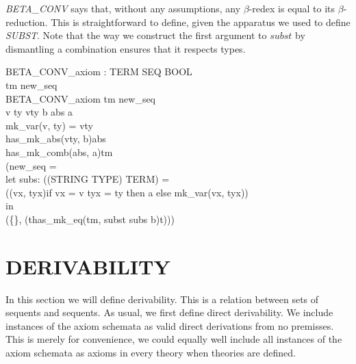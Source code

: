 \documentclass[a4paper,11pt,titlepage]{article}
\begin{document}
\begin{titlepage}
{\it BETA\_CONV} says that, without any assumptions,
any $\beta$-redex is
equal to its $\beta$-reduction.
This is straightforward
to define, given the apparatus we used to define
{\it SUBST}.
Note that the way we construct the first argument to
$subst$ by dismantling a combination ensures that it
respects types.
\begin{HOLConst}
\+	\PrNL{}BETA\_CONV\_axiom\PrNN{} : TERM \MMM{\rightarrow} SEQ \MMM{\rightarrow} BOOL\\
\PrPH{}
\+	\MMM{\forall} tm new\_seq\MMM{\bullet}\\
\+	BETA\_CONV\_axiom tm new\_seq \MMM{\Leftrightarrow}\\
\+	\MMM{\exists} v ty vty b abs a \MMM{\bullet}\\
\+	mk\_var(v, ty) = vty \MMM{\land}\\
\+	has\_mk\_abs(vty, b)abs \MMM{\land}\\
\+	has\_mk\_comb(abs, a)tm \MMM{\land}\\
\+	(new\_seq =\\
\+	let subs: ((STRING \MMM{\times} TYPE) \MMM{\rightarrow} TERM) =\\
\+		(\MMM{\lambda}(vx, tyx)\MMM{\bullet}if vx = v \MMM{\land} tyx = ty then a else mk\_var(vx, tyx))\\
\+	in\\
\+		(\{\}, (\MMM{\epsilon}t\MMM{\bullet}has\_mk\_eq(tm, subst subs b)t)))\\
\end{HOLConst}


\section{DERIVABILITY} \label{DERIVABILITY}


In this section we will define derivability.
This is a relation between sets of sequents
and sequents. As usual, we first define direct
derivability.
We include instances of the axiom schemata as valid
direct derivations from no premisses. This is merely
for convenience, we could equally well include all
instances of the axiom schemata as axioms in every theory
when theories are defined.


\end{titlepage}
\end{document}
